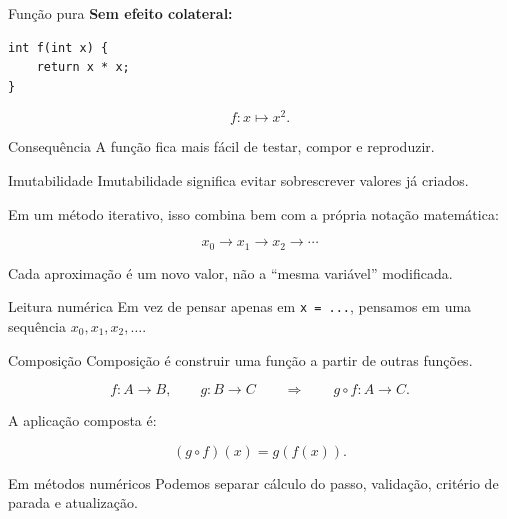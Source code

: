 \documentclass[aspectratio=169,11pt]{beamer}
\begin{document}
\begin{frame}[fragile]{Função pura}
  \textbf{Sem efeito colateral:}

  \begin{lstlisting}
int f(int x) {
    return x * x;
}
  \end{lstlisting}

  \begin{equation*}
    f:x\longmapsto x^2.
  \end{equation*}

  \begin{block}{Consequência}
    A função fica mais fácil de testar, compor e reproduzir.
  \end{block}
\end{frame}

\begin{frame}{Imutabilidade}
  Imutabilidade significa evitar sobrescrever valores já criados.

  \vspace{0.2cm}
  Em um método iterativo, isso combina bem com a própria notação matemática:

  \begin{equation*}
    x_0\longrightarrow x_1\longrightarrow x_2\longrightarrow\cdots
  \end{equation*}

  \vspace{0.2cm}
  Cada aproximação é um novo valor, não a ``mesma variável'' modificada.

  \begin{exampleblock}{Leitura numérica}
    Em vez de pensar apenas em \texttt{x = ...}, pensamos em uma sequência
    $x_0,x_1,x_2,\ldots$.
  \end{exampleblock}
\end{frame}

\begin{frame}{Composição}
  Composição é construir uma função a partir de outras funções.

  \begin{equation}\label{eq:composicao}
    f:A\longrightarrow B,
    \qquad
    g:B\longrightarrow C
    \qquad\Rightarrow\qquad
    g\circ f:A\longrightarrow C.
  \end{equation}

  \vspace{0.15cm}
  A aplicação composta é:

  \begin{equation*}
    (g\circ f)(x)=g(f(x)).
  \end{equation*}

  \begin{block}{Em métodos numéricos}
    Podemos separar cálculo do passo, validação, critério de parada e atualização.
  \end{block}
\end{frame}
\end{document}
